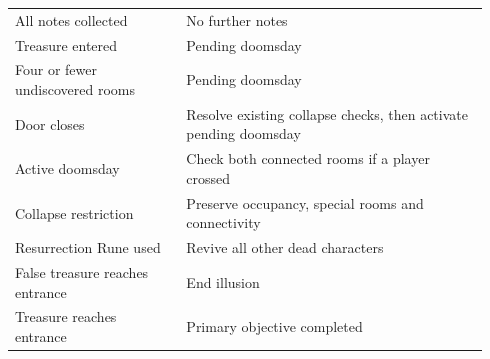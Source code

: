 \begin{longtable}{p{0.34\linewidth}p{0.6\linewidth}}
All notes collected & No further notes \\

Treasure entered & Pending doomsday \\

Four or fewer undiscovered rooms & Pending doomsday \\

Door closes & Resolve existing collapse checks, then activate pending doomsday \\

Active doomsday & Check both connected rooms if a player crossed \\

Collapse restriction & Preserve occupancy, special rooms and connectivity \\

Resurrection Rune used & Revive all other dead characters \\

False treasure reaches entrance & End illusion \\

Treasure reaches entrance & Primary objective completed \\

\end{longtable}
